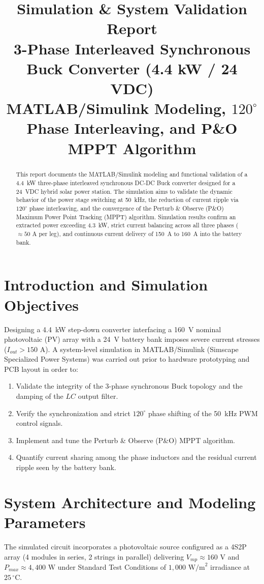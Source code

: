 \documentclass[11pt, a4paper]{article}
\title{\textbf{\LARGE Simulation \& System Validation Report}\\[0.3cm]
\Large 3-Phase Interleaved Synchronous Buck Converter (4.4 kW / 24 VDC)\\[0.2cm]
\large MATLAB/Simulink Modeling, $120^\circ$ Phase Interleaving, and P\&O MPPT Algorithm}
\author{}
\date{}
\begin{document}
\maketitle

\begin{abstract}
This report documents the MATLAB/Simulink modeling and functional validation of a 4.4~kW three-phase interleaved synchronous DC-DC Buck converter designed for a 24~VDC hybrid solar power station. The simulation aims to validate the dynamic behavior of the power stage switching at 50~kHz, the reduction of current ripple via $120^\circ$ phase interleaving, and the convergence of the Perturb \& Observe (P\&O) Maximum Power Point Tracking (MPPT) algorithm. Simulation results confirm an extracted power exceeding 4.3~kW, strict current balancing across all three phases ($\approx 50\text{ A}$ per leg), and continuous current delivery of 150~A to 160~A into the battery bank.
\end{abstract}

\vspace{0.5cm}

\section{Introduction and Simulation Objectives}
Designing a 4.4~kW step-down converter interfacing a 160~V nominal photovoltaic (PV) array with a 24~V battery bank imposes severe current stresses ($I_{out} > 150\text{ A}$). A system-level simulation in MATLAB/Simulink (Simscape Specialized Power Systems) was carried out prior to hardware prototyping and PCB layout in order to:
\begin{enumerate}
    \item Validate the integrity of the 3-phase synchronous Buck topology and the damping of the $LC$ output filter.
    \item Verify the synchronization and strict $120^\circ$ phase shifting of the 50~kHz PWM control signals.
    \item Implement and tune the Perturb \& Observe (P\&O) MPPT algorithm.
    \item Quantify current sharing among the phase inductors and the residual current ripple seen by the battery bank.
\end{enumerate}

\section{System Architecture and Modeling Parameters}
The simulated circuit incorporates a photovoltaic source configured as a 4S2P array (4 modules in series, 2 strings in parallel) delivering $V_{mp} \approx 160\text{ V}$ and $P_{max} \approx 4{,}400\text{ W}$ under Standard Test Conditions of $1{,}000\text{ W/m}^2$ irradiance at $25\,^\circ\text{C}$.
\end{document}
